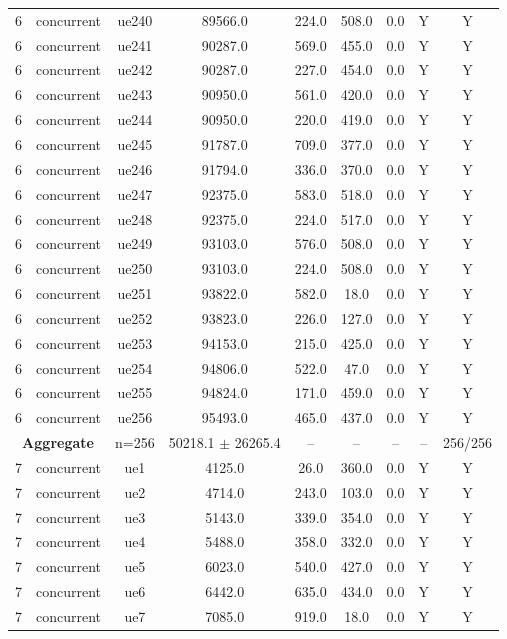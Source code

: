 \begin{table}[ht]
\begin{tabular}{|c|c|c|c|c|c|c|c|c|}
6 & concurrent & ue240 & 89566.0 & 224.0 & 508.0 & 0.0 & Y & Y \\
6 & concurrent & ue241 & 90287.0 & 569.0 & 455.0 & 0.0 & Y & Y \\
6 & concurrent & ue242 & 90287.0 & 227.0 & 454.0 & 0.0 & Y & Y \\
6 & concurrent & ue243 & 90950.0 & 561.0 & 420.0 & 0.0 & Y & Y \\
6 & concurrent & ue244 & 90950.0 & 220.0 & 419.0 & 0.0 & Y & Y \\
6 & concurrent & ue245 & 91787.0 & 709.0 & 377.0 & 0.0 & Y & Y \\
6 & concurrent & ue246 & 91794.0 & 336.0 & 370.0 & 0.0 & Y & Y \\
6 & concurrent & ue247 & 92375.0 & 583.0 & 518.0 & 0.0 & Y & Y \\
6 & concurrent & ue248 & 92375.0 & 224.0 & 517.0 & 0.0 & Y & Y \\
6 & concurrent & ue249 & 93103.0 & 576.0 & 508.0 & 0.0 & Y & Y \\
6 & concurrent & ue250 & 93103.0 & 224.0 & 508.0 & 0.0 & Y & Y \\
6 & concurrent & ue251 & 93822.0 & 582.0 & 18.0 & 0.0 & Y & Y \\
6 & concurrent & ue252 & 93823.0 & 226.0 & 127.0 & 0.0 & Y & Y \\
6 & concurrent & ue253 & 94153.0 & 215.0 & 425.0 & 0.0 & Y & Y \\
6 & concurrent & ue254 & 94806.0 & 522.0 & 47.0 & 0.0 & Y & Y \\
6 & concurrent & ue255 & 94824.0 & 171.0 & 459.0 & 0.0 & Y & Y \\
6 & concurrent & ue256 & 95493.0 & 465.0 & 437.0 & 0.0 & Y & Y \\
\multicolumn{2}{|c|}{\textbf{Aggregate}} & n=256 & 50218.1 $\pm$ 26265.4 & -- & -- & -- & -- & 256/256 \\
\hline
7 & concurrent & ue1 & 4125.0 & 26.0 & 360.0 & 0.0 & Y & Y \\
7 & concurrent & ue2 & 4714.0 & 243.0 & 103.0 & 0.0 & Y & Y \\
7 & concurrent & ue3 & 5143.0 & 339.0 & 354.0 & 0.0 & Y & Y \\
7 & concurrent & ue4 & 5488.0 & 358.0 & 332.0 & 0.0 & Y & Y \\
7 & concurrent & ue5 & 6023.0 & 540.0 & 427.0 & 0.0 & Y & Y \\
7 & concurrent & ue6 & 6442.0 & 635.0 & 434.0 & 0.0 & Y & Y \\
7 & concurrent & ue7 & 7085.0 & 919.0 & 18.0 & 0.0 & Y & Y \\

\end{tabular}
\end{table}
